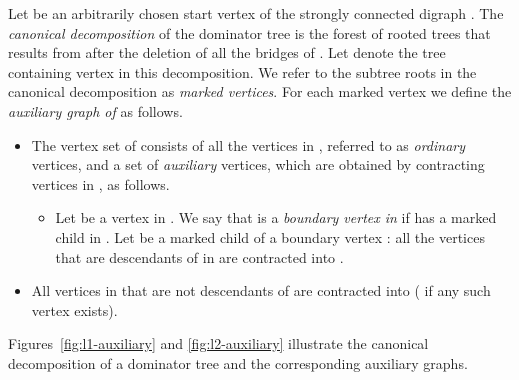 \documentclass[11pt]{article}
\begin{document}
Let  be an arbitrarily chosen start vertex of the strongly connected digraph .
The \emph{canonical decomposition} of the dominator tree  is the forest of rooted trees that results from  after the deletion of all the bridges of .
Let  denote the tree containing vertex  in this decomposition. We refer to the subtree roots in the canonical decomposition as \emph{marked vertices}.
For each marked vertex  we define the \emph{auxiliary graph  of } as follows.
\begin{itemize}
\item The vertex set  of  consists of all the vertices in , referred to as \emph{ordinary} vertices, and a set of
\emph{auxiliary} vertices, which are obtained by contracting vertices in , as follows.
\begin{itemize}
\item Let  be a vertex in .
We say that  is a \emph{boundary vertex in}  if  has a marked child in .
Let  be a marked child of a boundary vertex :
all the vertices that are descendants of   in   are contracted into .
\end{itemize}
\item All vertices in  that are not descendants of  are contracted into  ( if any such vertex exists).
\end{itemize}
Figures~\ref{fig:l1-auxiliary} and \ref{fig:l2-auxiliary} illustrate the canonical decomposition of a dominator tree and the corresponding auxiliary graphs. 
\end{document}
